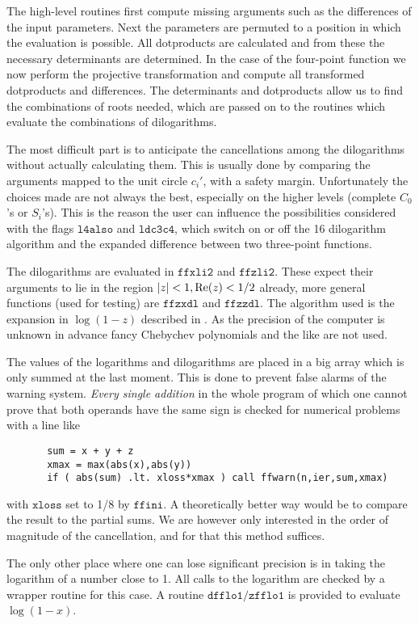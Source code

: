 \documentclass[twoside,12pt]{report}
\def\limfunc#1{\mathop{\rm #1}}
\def\Re{\limfunc{Re}}
\def\Code#1{\ensuremath{\texttt{#1}}}
\begin{document}
\begin{appendix}
The high-level routines first compute missing arguments such as the 
differences of the input parameters.  Next the parameters are permuted 
to a position in which the evaluation is possible.  All dotproducts are 
calculated and from these the necessary determinants are determined.  In 
the case of the four-point function we now perform the projective 
transformation and compute all transformed dotproducts and differences.  
The determinants and dotproducts allow us to find the combinations of 
roots needed, which are passed on to the routines which evaluate the 
combinations of dilogarithms.

The most difficult part is to anticipate the cancellations among the 
dilogarithms without actually calculating them.  This is usually done by 
comparing the arguments mapped to the unit circle $c_i'$, with a safety 
margin.  Unfortunately the choices made are not always the best, 
especially on the higher levels (complete $C_0$'s or $S_i$'s).  This is 
the reason the user can influence the possibilities considered with the 
flags \Code{l4also} and \Code{ldc3c4}, which switch on or off the 16 
dilogarithm algorithm and the expanded difference between two 
three-point functions.

The dilogarithms are evaluated in \Code{ffxli2} and \Code{ffzli2}.  
These expect their arguments to lie in the region $|z| < 1, \Re(z) <1/2$ 
already, more general functions (used for testing) are \Code{ffzxdl} and 
\Code{ffzzdl}.  The algorithm used is the expansion in $\log(1-z)$ 
described in \cite{tHV79}.  As the precision of the computer is unknown 
in advance fancy Chebychev polynomials and the like are not used.

The values of the logarithms and dilogarithms are placed in a big array 
which is only summed at the last moment.  This is done to prevent false 
alarms of the warning system.  {\em Every single addition} in the whole 
program of which one cannot prove that both operands have the same sign 
is checked for numerical problems with a line like
\begin{verbatim}
       sum = x + y + z
       xmax = max(abs(x),abs(y))
       if ( abs(sum) .lt. xloss*xmax ) call ffwarn(n,ier,sum,xmax)
\end{verbatim}
with \Code{xloss} set to 1/8 by \Code{ffini}.  A theoretically better 
way would be to compare the result to the partial sums.  We are however 
only interested in the order of magnitude of the cancellation, and for 
that this method suffices.

The only other place where one can lose significant precision is in 
taking the logarithm of a number close to 1.  All calls to the logarithm 
are checked by a wrapper routine for this case.  A routine 
\Code{dfflo1/zfflo1} is provided to evaluate $\log(1-x)$.


\end{appendix}
\end{document}
